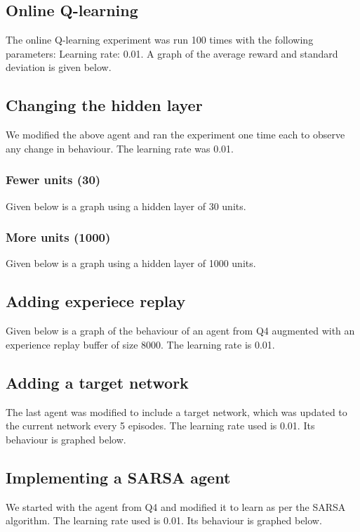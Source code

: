 \documentclass[paper=a4, fontsize=11pt]{scrartcl} %
\numberwithin{equation}{section} %
\numberwithin{figure}{section} %
\numberwithin{table}{section} %
\begin{document}
\subsection{Online Q-learning}

The online Q-learning experiment was run 100 times with the following parameters: Learning rate: 0.01. A graph of the average reward and standard deviation is given below.

\subsection{Changing the hidden layer}
We modified the above agent and ran the experiment one time each to observe any change in behaviour. The learning rate was 0.01.

\subsubsection{Fewer units (30)}
Given below is a graph using a hidden layer of 30 units.


\subsubsection{More units (1000)}
Given below is a graph using a hidden layer of 1000 units.


\subsection{Adding experiece replay}
Given below is a graph of the behaviour of an agent from Q4 augmented with an experience replay buffer of size 8000. The learning rate is 0.01.

\subsection{Adding a target network}
The last agent was modified to include a target network, which was updated to the current network every 5 episodes. The learning rate used is 0.01. Its behaviour is graphed below.


\subsection{Implementing a SARSA agent}
We started with the agent from Q4 and modified it to learn as per the SARSA algorithm. The learning rate used is 0.01. Its behaviour is graphed below.
\end{document}
